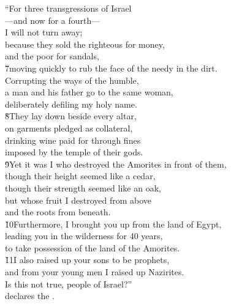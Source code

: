 \begin{poetry}
\poeml ``For three transgressions of Israel \\
\poemll    ---and now for a fourth--- \\
\poemlll       I will not turn away; \\
\poeml because they sold the righteous for money, \\
\poemll    and the poor for sandals, \\
\poeml \v{7}moving quickly to rub the face of the needy in the dirt. \\
\poeml Corrupting the ways of the humble, \\
\poemll    a man and his father go to the same woman, \\
\poemlll       deliberately defiling my holy name. \\
\poeml \v{8}They lay down beside every altar, \\
\poemll    on garments pledged as collateral, \\
\poeml drinking wine paid for through fines \\
\poemll    imposed by the temple of their gods. \\
\poeml \v{9}Yet it was I who destroyed the Amorites in front of them, \\
\poemll    though their height seemed like a cedar, \\
\poemll    though their strength seemed like an oak, \\
\poeml but whose fruit I destroyed from above \\
\poemll    and the roots from beneath. \\
\poeml \v{10}Furthermore, I brought you up from the land of Egypt, \\
\poemll    leading you in the wilderness for 40 years, \\
\poemlll       to take possession of the land of the Amorites. \\
\poeml \v{11}I also raised up your sons to be prophets, \\
\poemll    and from your young men I raised up Nazirites. \\
\poeml Is this not true, people of Israel?'' \\
\poemll    declares the . \\

\end{poetry}
